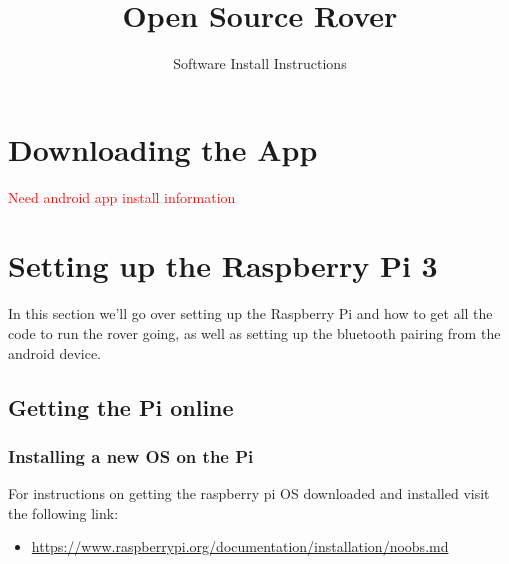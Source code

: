 \documentclass[12pt]{article}
\begin{document}
\title{Open Source Rover}
\author{Software Install Instructions}

\makeatletter         
\def\@maketitle{
\begin{center}	
	\makebox[\textwidth][c]{ \texttt{[image: "Pictures/software title".png]}}
	{\Huge \bfseries \sffamily \@title }\\[4ex] 
	{\huge \bfseries \sffamily \@author}\\[4ex] 
	\texttt{[image: "Pictures/JPL logo".png]}
\end{center}}
\makeatother

\maketitle

\newpage


\tableofcontents

\newpage


\section{Downloading the App}
\textcolor{red}{Need android app install information}

\section{Setting up the Raspberry Pi 3}
In this section we'll go over setting up the Raspberry Pi and how to get all the code to run the rover going, as well as setting up the bluetooth pairing from the android device.
\subsection{Getting the Pi online}

\subsubsection{Installing a new OS on the Pi}

For instructions on getting the raspberry pi OS downloaded and installed visit the following link:

\begin{itemize}
	\item \href{https://www.raspberrypi.org/documentation/installation/noobs.md}{https://www.raspberrypi.org/documentation/installation/noobs.md}
\end{itemize}
\end{document}
